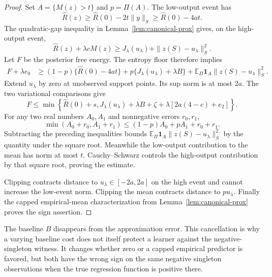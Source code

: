 \begin{proof}
Set $A=\{M(z)>t\}$ and $p=\Pi(A)$. The low-output event has
\[
 \widehat R(z)\ge\widehat R(0)-2t\|y\|_S
               \ge\widehat R(0)-4at.
\]
The quadratic-gap inequality in Lemma~\ref{lem:canonical-prox} gives, on the high-output event,
\[
 \widehat R(z)+\lambda cM(z)
 \ge J_\lambda(u_\lambda)+\|z(S)-u_\lambda\|_S^2.
\]
Let $F$ be the posterior free energy. The entropy floor therefore implies
\begin{align*}
 F+\lambda e_0
 &\ge (1-p)\{\widehat R(0)-4at\}
       +p\{J_\lambda(u_\lambda)+\lambda B\}
       +\mathbb E_\Pi\mathbf1_A\|z(S)-u_\lambda\|_S^2.
\end{align*}
Extend $u_\lambda$ by zero at unobserved support points. Its sup norm is at most $2a$. The two variational comparisons give
\[
 F\le\min\left\{\widehat R(0)+s,
   J_\lambda(u_\lambda)+\lambda B+\zeta+
          \lambda[2a(4-c)+e_2]\right\}.
\]
For any two real numbers $A_0,A_1$ and nonnegative errors $r_0,r_1$,
\[
 \min(A_0+r_0,A_1+r_1)
 \le (1-p)A_0+pA_1+r_0+r_1.
\]
Subtracting the preceding inequalities bounds
$\mathbb E_\Pi\mathbf1_A\|z(S)-u_\lambda\|_S^2$ by the quantity under the square root. Meanwhile the low-output contribution to the mean has norm at most $t$. Cauchy--Schwarz controls the high-output contribution by that square root, proving the estimate.

Clipping contracts distance to $u_\lambda\in[-2a,2a]$ on the high event and cannot increase the low-event norm. Clipping the mean contracts distance to $p u_\lambda$. Finally the capped empirical-mean characterization from Lemma~\ref{lem:canonical-prox} proves the sign assertion.
\end{proof}

The baseline $B$ disappears from the approximation error. This cancellation is why a varying baseline cost does not itself protect a learner against the negative-singleton witness. It changes whether zero or a capped empirical predictor is favored, but both have the wrong sign on the same negative singleton observations when the true regression function is positive there.
